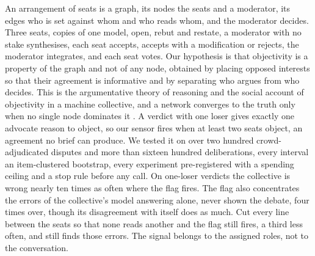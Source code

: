 An arrangement of seats is a graph, its nodes the seats and a moderator, its
edges who is set against whom and who reads whom, and the moderator decides.
Three seats, copies of one model, open, rebut and restate, a moderator with
no stake synthesises, each seat accepts, accepts with a modification or
rejects, the moderator integrates, and each seat votes. Our hypothesis is
that objectivity is a property of the graph and not of any node, obtained
by placing opposed interests so that their agreement is informative and by
separating who argues from who decides. This is the argumentative theory of
reasoning \citep{mercier2011argumentative} and the social account of
objectivity \citep{longino1990science} in a machine collective, and a
network converges to the truth only when no single node dominates it
\citep{golub2010naive}. A verdict with one loser gives exactly one advocate
reason to object, so our sensor fires when at least two seats object, an
agreement no brief can produce. We tested it on over two hundred
crowd-adjudicated disputes and more than sixteen hundred deliberations,
every interval an item-clustered bootstrap, every experiment pre-registered
with a spending ceiling and a stop rule before any call.
On one-loser verdicts the collective is wrong nearly ten times as often
where the flag fires.
The flag also concentrates the errors of the collective's model answering
alone, never shown the debate, four times over, though its disagreement
with itself does as much. Cut every line between the seats so that none
reads another and the flag still fires, a third less often, and still finds
those errors. The signal belongs to the assigned roles, not to the
conversation.

